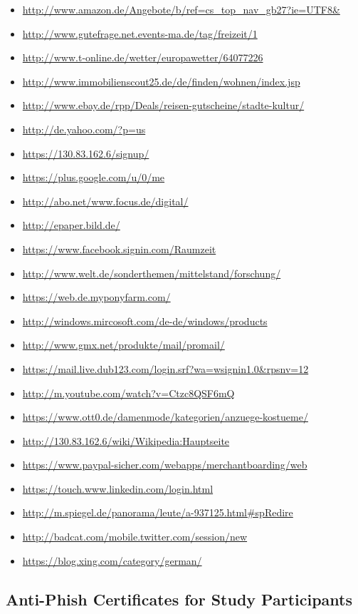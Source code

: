 \begin{itemize}
\item \url{http://www.amazon.de/Angebote/b/ref=cs_top_nav_gb27?ie=UTF8&}
\item \url{http://www.gutefrage.net.events-ma.de/tag/freizeit/1}
\item \url{http://www.t-online.de/wetter/europawetter/64077226}
\item \url{http://www.immobilienscout25.de/de/finden/wohnen/index.jsp}
\item \url{http://www.ebay.de/rpp/Deals/reisen-gutscheine/stadte-kultur/}
\item \url{http://de.yahoo.com/?p=us}
\item \url{https://130.83.162.6/signup/}
\item \url{https://plus.google.com/u/0/me}
\item \url{http://abo.net/www.focus.de/digital/}
\item \url{http://epaper.bild.de/}
\item \url{https://www.facebook.signin.com/Raumzeit}
\item \url{http://www.welt.de/sonderthemen/mittelstand/forschung/}
\item \url{https://web.de.myponyfarm.com/}
\item \url{http://windows.mircosoft.com/de-de/windows/products}
\item \url{http://www.gmx.net/produkte/mail/promail/}
\item \url{https://mail.live.dub123.com/login.srf?wa=wsignin1.0&rpsnv=12}
\item \url{http://m.youtube.com/watch?v=Ctzc8QSF6mQ}
\item \url{https://www.ott0.de/damenmode/kategorien/anzuege-kostueme/}
\item \url{http://130.83.162.6/wiki/Wikipedia:Hauptseite}
\item \url{https://www.paypal-sicher.com/webapps/merchantboarding/web}
\item \url{https://touch.www.linkedin.com/login.html}
\item \url{http://m.spiegel.de/panorama/leute/a-937125.html#spRedire}
\item \url{http://badcat.com/mobile.twitter.com/session/new}
\item \url{https://blog.xing.com/category/german/}
\end{itemize}



\subsection{Anti-Phish Certificates for Study Participants}
\label{s:antiphish_certs}



